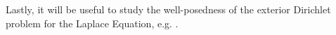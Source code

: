 \begin{proposition}
    
\end{proposition}
Lastly, it will be useful to study the well-posedness of the exterior Dirichlet problem for the Laplace Equation, e.g. \cite{salsa2016partial}.
